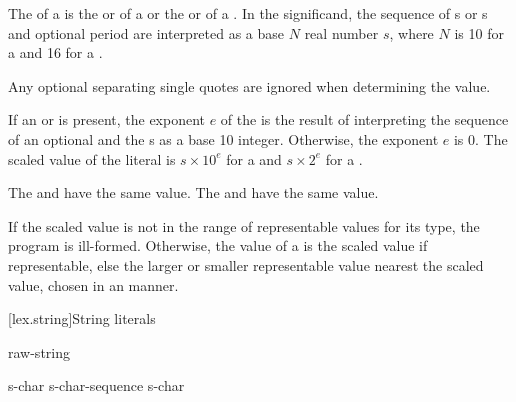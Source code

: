 \documentclass{wg21}
\begin{document}
\pnum
{}%
The  of a 
is the  or 
of a 
or the 
or 
of a .
In the significand,
the sequence of s or s
and optional period are interpreted as a base $N$ real number $s$,
where $N$ is 10 for a  and
16 for a .
\begin{note}
    Any optional separating single quotes are ignored when determining the value.
\end{note}
If an  or 
is present,
the exponent $e$ of the 
is the result of interpreting
the sequence of an optional  and the s
as a base 10 integer.
Otherwise, the exponent $e$ is 0.
The scaled value of the literal is
$s \times 10^e$ for a  and
$s \times 2^e$ for a .
\begin{example}
    The 
     and  have the same value.
    The 
     and 
    have the same value.
\end{example}

\pnum
If the scaled value is not in the range of representable
values for its type, the program is ill-formed.
Otherwise, the value of a 
is the scaled value if representable,
else the larger or smaller representable value nearest the scaled value,
chosen in an  manner.

[lex.string]{String literals}

%
\begin{bnf}
    \br
       \br
      raw-string
\end{bnf}

\begin{bnf}
    \br
    s-char\br
    s-char-sequence s-char
\end{bnf}
\end{document}
